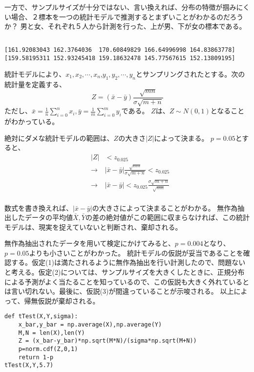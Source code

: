\documentclass[a4paper,11pt,dvipdfmx]{jsarticle}
\begin{document}
一方で、サンプルサイズが十分ではない、言い換えれば、分布の特徴が掴みにくい場合、２標本を一つの統計モデルで推測するとまずいことがわかるのだろうか？
男と女、それぞれ５人から計測を行った、上が男、下が女の標本である。
\begin{lstlisting}

[161.92083043 162.3764036  170.60849829 166.64996998 164.83863778]
[159.58195311 152.93245418 159.18632478 145.77567615 152.13809195]
\end{lstlisting}


統計モデルにより、$x_1,x_2,\cdots,x_n$,$y_1,y_2,\cdots,y_n$とサンプリングされたとする。次の統計量を定義する、
$$
Z=(\bar{x}-\bar{y})\frac{\sqrt{mn}}{\sigma\sqrt{m+n}}
$$
ただし、$\bar{x}=\frac{1}{n}\sum_{i=0}^{n} x_i,\bar{y}=\frac{1}{m}\sum_{i=0}^m y_i$である。
$Z$は、$Z\sim N(0,1)$となることがわかっている。

絶対にダメな統計モデルの範囲は、$Z$の大きさ$|Z|$によって決まる。
$p=0.05$とすると、
\begin{eqnarray*}
    &|Z|& < z_{0.025}\\
    &\rightarrow & |\bar{x}-\bar{y}|\frac{\sqrt{mn}}{\sigma\sqrt{m+n}} < z_{0.025}\\
    &\rightarrow& |\bar{x}-\bar{y}| <z_{0.025}\frac{ \sigma\sqrt{m+n} }{ \sqrt{mn }}\\
\end{eqnarray*}


数式を書き換えれば、$|\bar{x}-\bar{y}|$の大きさによって決まることがわかる。
無作為抽出したデータの平均値$\bar{X},\bar{Y}$の差の絶対値がこの範囲に収まらなければ、この統計モデルは、現実を捉えていないと判断され、棄却される。

無作為抽出されたデータを用いて検定にかけてみると、$p=0.004$となり、$p=0.05$よりも小さいことがわかった。
統計モデルの仮説が妥当であることを確認する。仮定(1)は満たされるように無作為抽出を行い計測したので、問題ないと考える。仮定(2)については、サンプルサイズを大きくしたときに、正規分布による予測がよく当たることを知っているので、この仮説も大きく外れているとは言い切れない。最後に、仮説(3)が間違っていることが示唆される。
以上によって、帰無仮説が棄却される。



\begin{lstlisting}
def tTest(X,Y,sigma):
    x_bar,y_bar = np.average(X),np.average(Y)
    M,N = len(X),len(Y)
    Z = (x_bar-y_bar)*np.sqrt(M*N)/(sigma*np.sqrt(M+N))
    p=norm.cdf(Z,0,1)
    return 1-p
tTest(X,Y,5.7)
\end{lstlisting}
\end{document}
